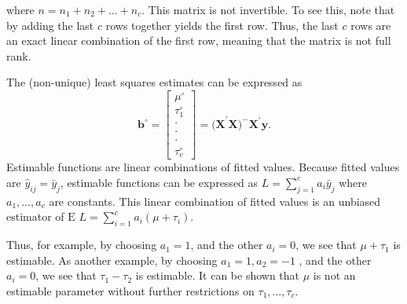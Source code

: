 \noindent where $n=n_1+n_2+\ldots+n_{c}$. This matrix is not
invertible. To see this, note that by adding the last $c$ rows
together yields the first row. Thus, the last $c$ rows are an exact
linear combination of the first row, meaning that the matrix is not
full rank.

The (non-unique) least squares estimates can be expressed as
\begin{equation*}
\mathbf{b}^{\circ }=%
\begin{bmatrix}
\mu ^{\circ } \\
\tau_1^{\circ } \\
\cdot  \\
\cdot  \\
\cdot  \\
\tau_c^{\circ }%
\end{bmatrix}%
=\mathbf{(X}^{\prime}\mathbf{X)}^{-}\mathbf{X}^{\prime}\mathbf{y.}
\end{equation*}
Estimable functions are linear combinations of fitted values.
Because fitted values are $\hat{y}_{ij}=\bar{y}_j$, estimable
functions can be expressed as $ L=\sum_{j=1}^{c}a_i\bar{y}_j $ where
$a_1,\ldots,a_{c}$ are constants. This linear combination of fitted
values is an unbiased estimator of $\text{E }L=\sum_{i=1}^{c}a_i(\mu
+\tau_i). $

Thus, for example, by choosing $a_1=1$, and the other $a_i=0$, we
see that $\mu
+\tau_1$ is estimable. As another example, by choosing $a_1=1,a_2=-1$%
, and the other $a_i=0$, we see that $\tau_1-\tau_2$ is estimable.
It can be shown that $\mu $ is not an estimable parameter without
further restrictions on $\tau_1,\ldots,\tau_c$.
